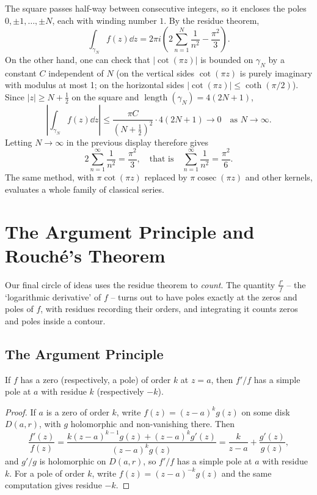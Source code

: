 \documentclass[a4paper]{scrartcl}
\begin{document}
\begin{example}
    The square passes half-way between consecutive integers, so it encloses the poles $0, \pm 1, \dots, \pm N$, each with winding number $1$. By the residue theorem,
    $$
    \int_{\gamma_N} f(z) \dd z = 2 \pi i \left(2\sum_{n = 1}^{N} \frac{1}{n^2} - \frac{\pi^2}{3}\right).
    $$
    On the other hand, one can check that $|\cot(\pi z)|$ is bounded on $\gamma_N$ by a constant $C$ independent of $N$ (on the vertical sides $\cot(\pi z)$ is purely imaginary with modulus at most 1; on the horizontal sides $|\cot(\pi z)| \leq \coth(\pi/2)$). Since $|z| \geq N + \frac{1}{2}$ on the square and $\operatorname{length}(\gamma_N) = 4(2N + 1)$,
    $$
    \left|\int_{\gamma_N} f(z) \dd z \right| \leq \frac{\pi C}{(N + \frac{1}{2})^2}\cdot 4(2N + 1) \rightarrow 0 \quad \text{as } N \rightarrow \infty.
    $$
    Letting $N \rightarrow \infty$ in the previous display therefore gives
    $$
    2 \sum_{n = 1}^{\infty} \frac{1}{n^2} = \frac{\pi^2}{3}, \quad \text{that is} \quad \sum_{n = 1}^{\infty}\frac{1}{n^2} = \frac{\pi^2}{6}.
    $$
    The same method, with $\pi \cot (\pi z)$ replaced by $\pi \operatorname{cosec}(\pi z)$ and other kernels, evaluates a whole family of classical series.
\end{example}

\section{The Argument Principle and Rouch\'e's Theorem}

Our final circle of ideas uses the residue theorem to \emph{count}. The quantity $\frac{f'}{f}$ -- the `logarithmic derivative' of $f$ -- turns out to have poles exactly at the zeros and poles of $f$, with residues recording their orders, and integrating it counts zeros and poles inside a contour.

\subsection{The Argument Principle}

\begin{proposition}
    If $f$ has a zero (respectively, a pole) of order $k$ at $z = a$, then $f'/f$ has a simple pole at $a$ with residue $k$ (respectively $-k$).
\end{proposition}
\begin{proof}
    If $a$ is a zero of order $k$, write $f(z) = (z - a)^k g(z)$ on some disk $D(a, r)$, with $g$ holomorphic and non-vanishing there. Then
    $$
    \frac{f'(z)}{f(z)} = \frac{k(z - a)^{k - 1}g(z) + (z - a)^k g'(z)}{(z - a)^k g(z)} = \frac{k}{z - a} + \frac{g'(z)}{g(z)},
    $$
    and $g'/g$ is holomorphic on $D(a, r)$, so $f'/f$ has a simple pole at $a$ with residue $k$. For a pole of order $k$, write $f(z) = (z - a)^{-k}g(z)$ and the same computation gives residue $-k$.
\end{proof}
\end{document}
